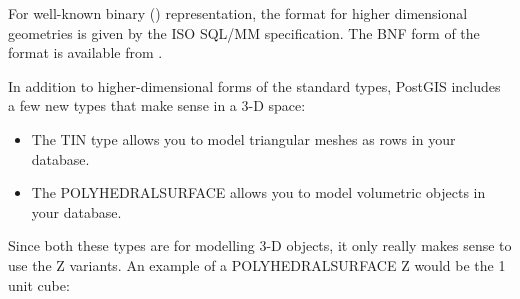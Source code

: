 \documentclass[a4paper,11pt,english]{sphinxmanual}
\begin{document}
For well-known binary ({\hyperref[\detokenize{glossary:term-wkb}]{}}) representation, the format for higher dimensional geometries is given by the ISO SQL/MM specification. The BNF form of the format is available from .

In addition to higher-dimensional forms of the standard types, PostGIS includes a few new types that make sense in a 3-D space:
\begin{itemize}
\item {} 
The TIN type allows you to model triangular meshes as rows in your database.

\item {} 
The POLYHEDRALSURFACE allows you to model volumetric objects in your database.

\end{itemize}

Since both these types are for modelling 3-D objects, it only really makes sense to use the Z variants.  An example of a POLYHEDRALSURFACE Z would be the 1 unit cube:
\end{document}
